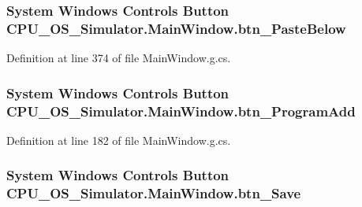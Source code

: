 \subsubsection[{btn\+\_\+\+Paste\+Below}]{\setlength{\rightskip}{0pt plus 5cm}System Windows Controls Button C\+P\+U\+\_\+\+O\+S\+\_\+\+Simulator.\+Main\+Window.\+btn\+\_\+\+Paste\+Below\hspace{0.3cm}{\ttfamily [package]}}\label{class_c_p_u___o_s___simulator_1_1_main_window_a1c24521ff648d75bf5991567e1a85b55}


Definition at line 374 of file Main\+Window.\+g.\+cs.

\hypertarget{class_c_p_u___o_s___simulator_1_1_main_window_a4f0d9f8f3d56b76616367438d04b4fde}{}
\subsubsection[{btn\+\_\+\+Program\+Add}]{\setlength{\rightskip}{0pt plus 5cm}System Windows Controls Button C\+P\+U\+\_\+\+O\+S\+\_\+\+Simulator.\+Main\+Window.\+btn\+\_\+\+Program\+Add\hspace{0.3cm}{\ttfamily [package]}}\label{class_c_p_u___o_s___simulator_1_1_main_window_a4f0d9f8f3d56b76616367438d04b4fde}


Definition at line 182 of file Main\+Window.\+g.\+cs.

\hypertarget{class_c_p_u___o_s___simulator_1_1_main_window_a638eee3b21f6ac5d28a5c95c4dad3fc2}{}
\subsubsection[{btn\+\_\+\+Save}]{\setlength{\rightskip}{0pt plus 5cm}System Windows Controls Button C\+P\+U\+\_\+\+O\+S\+\_\+\+Simulator.\+Main\+Window.\+btn\+\_\+\+Save\hspace{0.3cm}{\ttfamily [package]}}\label{class_c_p_u___o_s___simulator_1_1_main_window_a638eee3b21f6ac5d28a5c95c4dad3fc2}


